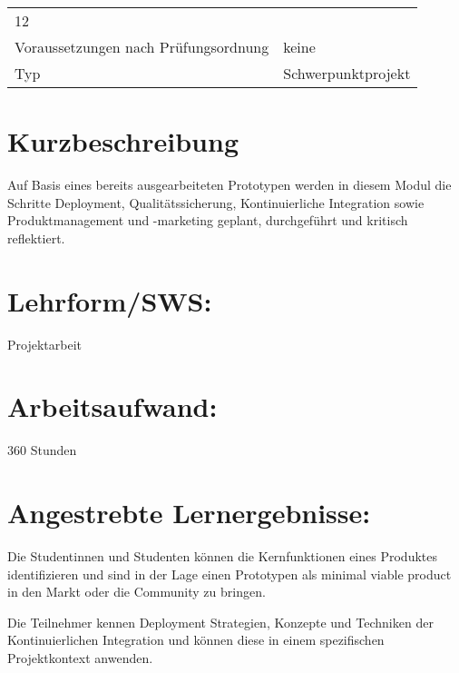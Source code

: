 \begin{longtable}[]{@{}ll@{}}
\begin{minipage}[t]{0.12\columnwidth}
12\strut
\end{minipage}\tabularnewline
\begin{minipage}[t]{0.12\columnwidth}\raggedright\strut
Voraussetzungen nach Prüfungsordnung\strut
\end{minipage} & \begin{minipage}[t]{0.12\columnwidth}\raggedright\strut
keine\strut
\end{minipage}\tabularnewline
\begin{minipage}[t]{0.12\columnwidth}\raggedright\strut
Typ\strut
\end{minipage} & \begin{minipage}[t]{0.12\columnwidth}\raggedright\strut
Schwerpunktprojekt\strut
\end{minipage}\tabularnewline
\bottomrule
\end{longtable}

\section*{Kurzbeschreibung}\label{kurzbeschreibung-3}

Auf Basis eines bereits ausgearbeiteten Prototypen werden in diesem
Modul die Schritte Deployment, Qualitätssicherung, Kontinuierliche
Integration sowie Produktmanagement und -marketing geplant, durchgeführt
und kritisch reflektiert.

\section*{Lehrform/SWS:}\label{lehrformsws-9}

Projektarbeit

\section*{Arbeitsaufwand:}\label{arbeitsaufwand-15}

360 Stunden

\section*{Angestrebte
Lernergebnisse:}\label{angestrebte-lernergebnisse-9}

Die Studentinnen und Studenten können die Kernfunktionen eines Produktes
identifizieren und sind in der Lage einen Prototypen als minimal viable
product in den Markt oder die Community zu bringen.

Die Teilnehmer kennen Deployment Strategien, Konzepte und Techniken der
Kontinuierlichen Integration und können diese in einem spezifischen
Projektkontext anwenden.

